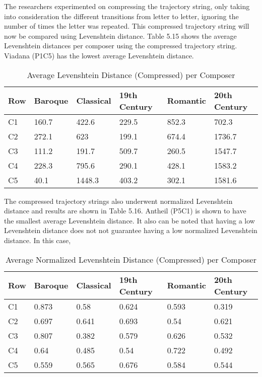 The researchers experimented on compressing the trajectory string, only taking into consideration the different transitions from letter to letter, ignoring the number of times the letter was repeated. This compressed trajectory string will now be compared using Levenshtein distance. Table 5.15 shows the average Levenshtein distances per composer using the compressed trajectory string. Viadana (P1C5) has the lowest average Levenshtein distance.

\begin{longtable}{|l|l|l|l|l|l|}
\caption{Average Levenshtein Distance (Compressed) per Composer}
\label{my-label}\\
\hline
Row & Baroque & Classical & 19th Century & Romantic & 20th Century \\ \hline
\endfirsthead
%
\endhead
%
C1 & 160.7 & 422.6 & 229.5 & 852.3 & 702.3 \\ \hline
C2 & 272.1 & 623 & 199.1 & 674.4 & 1736.7 \\ \hline
C3 & 111.2 & 191.7 & 509.7 & 260.5 & 1547.7 \\ \hline
C4 & 228.3 & 795.6 & 290.1 & 428.1 & 1583.2 \\ \hline
C5 & 40.1 & 1448.3 & 403.2 & 302.1 & 1581.6 \\ \hline
\end{longtable}

The compressed trajectory strings also underwent normalized Levenshtein distance and results are shown in Table 5.16. Antheil (P5C1) is shown to have the smallest average Levenshtein distance. It also can be noted that having a low Levenshtein distance does not not guarantee having a low normalized Levenshtein distance. In this case, 

\begin{longtable}{|l|l|l|l|l|l|}
\caption{Average Normalized Levenshtein Distance (Compressed) per Composer}
\label{my-label}\\
\hline
Row & Baroque & Classical & 19th Century & Romantic & 20th Century \\ \hline
\endfirsthead
%
\endhead
%
C1 & 0.873 & 0.58 & 0.624 & 0.593 & 0.319 \\ \hline
C2 & 0.697 & 0.641 & 0.693 & 0.54 & 0.621 \\ \hline
C3 & 0.807 & 0.382 & 0.579 & 0.626 & 0.532 \\ \hline
C4 & 0.64 & 0.485 & 0.54 & 0.722 & 0.492 \\ \hline
C5 & 0.559 & 0.565 & 0.676 & 0.584 & 0.544 \\ \hline
\end{longtable}

